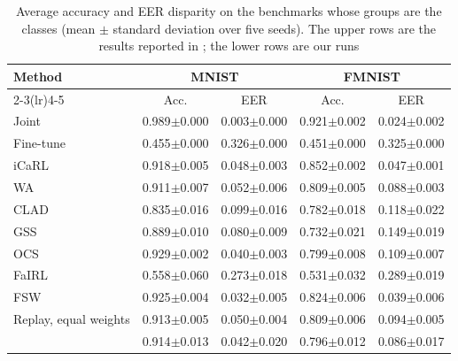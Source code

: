 \begin{table}[t]
\centering
\caption{Average accuracy and EER disparity on the benchmarks whose groups are the classes (mean $\pm$ standard deviation over five seeds). The upper rows are the results reported in \cite{park2026fsw}; the lower rows are our runs}\label{tab:eer}
\footnotesize
\setlength{\tabcolsep}{3pt}
\begin{tabular}{lcccc}
\toprule
Method & \multicolumn{2}{c}{MNIST} & \multicolumn{2}{c}{FMNIST} \\
\cmidrule(lr){2-3}\cmidrule(lr){4-5}
 & Acc. & EER & Acc. & EER \\
\midrule
Joint & 0.989\tiny{$\pm$0.000} & 0.003\tiny{$\pm$0.000} & 0.921\tiny{$\pm$0.002} & 0.024\tiny{$\pm$0.002} \\
Fine-tune & 0.455\tiny{$\pm$0.000} & 0.326\tiny{$\pm$0.000} & 0.451\tiny{$\pm$0.000} & 0.325\tiny{$\pm$0.000} \\
\midrule
iCaRL & 0.918\tiny{$\pm$0.005} & 0.048\tiny{$\pm$0.003} & 0.852\tiny{$\pm$0.002} & 0.047\tiny{$\pm$0.001} \\
WA & 0.911\tiny{$\pm$0.007} & 0.052\tiny{$\pm$0.006} & 0.809\tiny{$\pm$0.005} & 0.088\tiny{$\pm$0.003} \\
CLAD & 0.835\tiny{$\pm$0.016} & 0.099\tiny{$\pm$0.016} & 0.782\tiny{$\pm$0.018} & 0.118\tiny{$\pm$0.022} \\
GSS & 0.889\tiny{$\pm$0.010} & 0.080\tiny{$\pm$0.009} & 0.732\tiny{$\pm$0.021} & 0.149\tiny{$\pm$0.019} \\
OCS & 0.929\tiny{$\pm$0.002} & 0.040\tiny{$\pm$0.003} & 0.799\tiny{$\pm$0.008} & 0.109\tiny{$\pm$0.007} \\
FaIRL & 0.558\tiny{$\pm$0.060} & 0.273\tiny{$\pm$0.018} & 0.531\tiny{$\pm$0.032} & 0.289\tiny{$\pm$0.019} \\
FSW \cite{park2026fsw} & 0.925\tiny{$\pm$0.004} & 0.032\tiny{$\pm$0.005} & 0.824\tiny{$\pm$0.006} & 0.039\tiny{$\pm$0.006} \\
\midrule
Replay, equal weights & 0.913\tiny{$\pm$0.005} & 0.050\tiny{$\pm$0.004} & 0.809\tiny{$\pm$0.006} & 0.094\tiny{$\pm$0.005} \\
\method{} & 0.914\tiny{$\pm$0.013} & 0.042\tiny{$\pm$0.020} & 0.796\tiny{$\pm$0.012} & 0.086\tiny{$\pm$0.017} \\
\bottomrule
\end{tabular}
\end{table}
